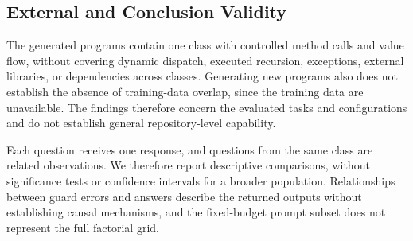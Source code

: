 \subsection{External and Conclusion Validity}

The generated programs contain one class with controlled method calls and value flow, without covering dynamic dispatch, executed recursion, exceptions, external libraries, or dependencies across classes. Generating new programs also does not establish the absence of training-data overlap, since the training data are unavailable. The findings therefore concern the evaluated tasks and configurations and do not establish general repository-level capability.

Each question receives one response, and questions from the same class are related observations. We therefore report descriptive comparisons, without significance tests or confidence intervals for a broader population. Relationships between guard errors and answers describe the returned outputs without establishing causal mechanisms, and the fixed-budget prompt subset does not represent the full factorial grid.
